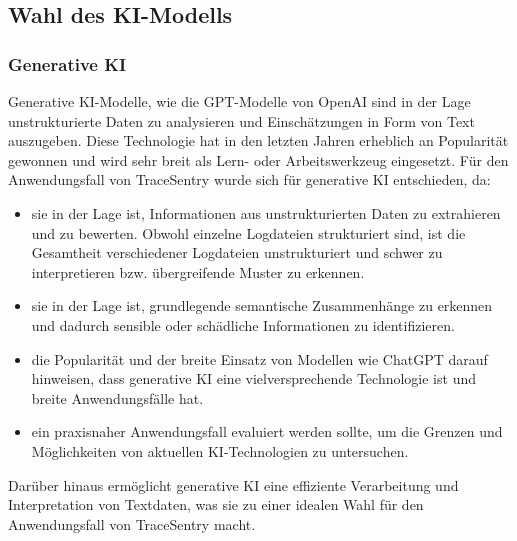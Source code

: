 \documentclass[a4paper,12pt]{report}
\begin{document}
    \subsection{Wahl des KI-Modells}\label{subsec:wahl-des-ki-modells}

    \subsubsection{Generative KI}\label{subsubsec:generative-ki}
    Generative KI-Modelle, wie die GPT-Modelle von OpenAI sind in der Lage unstrukturierte Daten zu analysieren und Einschätzungen in Form von Text auszugeben.
    Diese Technologie hat in den letzten Jahren erheblich an Popularität gewonnen und wird sehr breit als Lern- oder Arbeitswerkzeug eingesetzt.
    Für den Anwendungsfall von TraceSentry wurde sich für generative KI entschieden, da:
    \begin{itemize}
        \item sie in der Lage ist, Informationen aus unstrukturierten Daten zu extrahieren und zu bewerten.
        Obwohl einzelne Logdateien strukturiert sind, ist die Gesamtheit verschiedener Logdateien unstrukturiert und schwer zu interpretieren bzw. übergreifende Muster zu erkennen.
        \item sie in der Lage ist, grundlegende semantische Zusammenhänge zu erkennen und dadurch sensible oder schädliche Informationen zu identifizieren.
        \item die Popularität und der breite Einsatz von Modellen wie ChatGPT darauf hinweisen, dass generative KI eine vielversprechende Technologie ist und breite Anwendungsfälle hat.
        \item ein praxisnaher Anwendungsfall evaluiert werden sollte, um die Grenzen und Möglichkeiten von aktuellen KI-Technologien zu untersuchen.
    \end{itemize}
    Darüber hinaus ermöglicht generative KI eine effiziente Verarbeitung und Interpretation von Textdaten, was sie zu einer idealen Wahl für den Anwendungsfall von TraceSentry macht.
\end{document}
